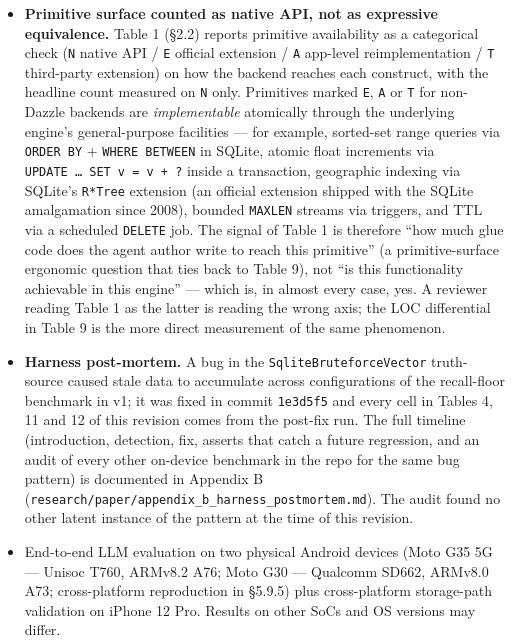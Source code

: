 \begin{itemize}
\item
  \textbf{Primitive surface counted as native API, not as expressive
  equivalence.} Table 1 (§2.2) reports primitive availability as a categorical
  check (\texttt{N} native API / \texttt{E} official extension / \texttt{A}
  app-level reimplementation / \texttt{T} third-party extension) on how the
  backend reaches each construct, with the headline count measured on \texttt{N}
  only. Primitives marked \texttt{E}, \texttt{A} or \texttt{T} for non-Dazzle
  backends are \emph{implementable} atomically through the underlying engine's
  general-purpose facilities --- for example, sorted-set range queries via
  \texttt{ORDER\ BY} + \texttt{WHERE\ BETWEEN} in SQLite, atomic float
  increments via \texttt{UPDATE\ …\ SET\ v\ =\ v\ +\ ?} inside a transaction,
  geographic indexing via SQLite's \texttt{R*Tree} extension (an official
  extension shipped with the SQLite amalgamation since 2008), bounded
  \texttt{MAXLEN} streams via triggers, and TTL via a scheduled \texttt{DELETE}
  job. The signal of Table 1 is therefore ``how much glue code does the agent
  author write to reach this primitive'' (a primitive-surface ergonomic question
  that ties back to Table 9), not ``is this functionality achievable in this
  engine'' --- which is, in almost every case, yes. A reviewer reading Table 1
  as the latter is reading the wrong axis; the LOC differential in Table 9 is
  the more direct measurement of the same phenomenon.
\item
  \textbf{Harness post-mortem.} A bug in the \texttt{SqliteBruteforceVector}
  truth-source caused stale data to accumulate across configurations of the
  recall-floor benchmark in v1; it was fixed in commit \texttt{1e3d5f5} and
  every cell in Tables 4, 11 and 12 of this revision comes from the post-fix
  run. The full timeline (introduction, detection, fix, asserts that catch a
  future regression, and an audit of every other on-device benchmark in the repo
  for the same bug pattern) is documented in Appendix B
  (\texttt{research/paper/appendix\_b\_harness\_postmortem.md}). The audit found
  no other latent instance of the pattern at the time of this revision.
\item
  End-to-end LLM evaluation on two physical Android devices (Moto G35 5G ---
  Unisoc T760, ARMv8.2 A76; Moto G30 --- Qualcomm SD662, ARMv8.0 A73;
  cross-platform reproduction in §5.9.5) plus cross-platform storage-path
  validation on iPhone 12 Pro. Results on other SoCs and OS versions may differ.

\end{itemize}
